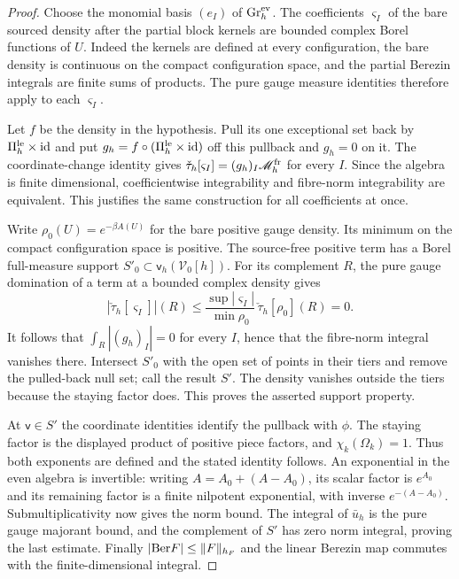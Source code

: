 \documentclass[11pt,letterpaper,reqno]{amsart}
\theoremstyle{definition}
\theoremstyle{remark}
\begin{document}
\begin{proof}
Choose the monomial basis $(e_I)$ of ${\rm Gr}^{\rm ev}_h$.
The coefficients $\varsigma_I$ of the bare sourced density after the
partial block kernels are bounded complex Borel functions of $U$.
Indeed the kernels are defined at every configuration, the bare
density is continuous on the compact configuration space, and the
partial Berezin integrals are finite sums of products. The pure gauge
measure identities therefore apply to each $\varsigma_I$.

Let $f$ be the density in the hypothesis. Pull its one exceptional
set back by $\Pi_h^{\rm le}\times{\rm id}$ and put
$g_h=f\circ(\Pi_h^{\rm le}\times{\rm id})$ off this pullback and
$g_h=0$ on it. The coordinate-change identity gives
$\check\tau_h[\varsigma_I]=(g_h)_I\mathscr M_h^{\rm fr}$ for
every $I$. Since the algebra is finite dimensional, coefficientwise
integrability and fibre-norm integrability are equivalent. This
justifies the same construction for all coefficients at once.

Write $\rho_0(U)=e^{-\beta A(U)}$ for the bare positive gauge
density. Its minimum on the compact configuration space is positive.
The source-free positive term has a Borel full-measure support
$S'_0\subset\mathsf v_h(\mathcal V_0[h])$. For its complement $R$,
the pure gauge domination of a term at a bounded complex density gives
\[
 |\check\tau_h[\varsigma_I]|(R)
 \le\frac{\sup|\varsigma_I|}{\min\rho_0}\,
                  \check\tau_h[\rho_0](R)=0.
\]
It follows that $\int_R|(g_h)_I|=0$ for every $I$, hence that the
fibre-norm integral vanishes there. Intersect $S'_0$ with the open
set of points in their tiers and remove the pulled-back null set;
call the result $S'$. The density vanishes outside the tiers because
the staying factor does. This proves the asserted support property.

At $\mathsf v\in S'$ the coordinate identities identify the pullback
with $\phi$. The staying factor is the displayed product of positive
piece factors, and $\chi_k(\Omega_k)=1$. Thus both exponents are
defined and the stated identity follows. An exponential in the even
algebra is invertible: writing $A=A_0+(A-A_0)$, its scalar factor is
$e^{A_0}$ and its remaining factor is a finite nilpotent exponential,
with inverse $e^{-(A-A_0)}$. Submultiplicativity now gives the norm
bound. The integral of $\bar u_h$ is the pure gauge majorant bound,
and the complement of $S'$ has zero norm integral, proving the last
estimate. Finally $|{\rm Ber}F|\le\|F\|_{h_F}$ and the linear
Berezin map commutes with the finite-dimensional integral.
\end{proof}
\end{document}
